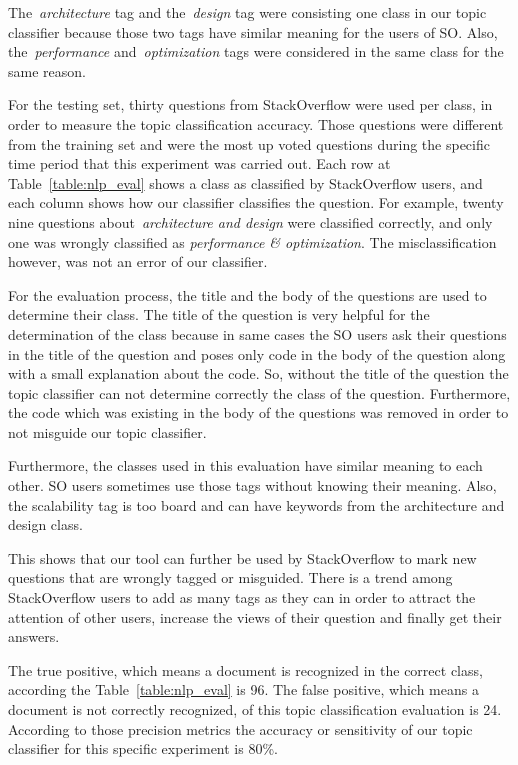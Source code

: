 The~\emph{architecture} tag and the~\emph{design} tag were consisting one class in our topic classifier because those two tags have similar meaning for the users of SO. Also, the~\emph{performance} and~\emph{optimization} tags were considered in the same class for the same reason.

For the testing set, thirty questions from StackOverflow were used per class, in order to measure the topic classification accuracy. Those questions were different from the training set and were the most up voted questions during the specific time period that this experiment was carried out. Each row at Table~\ref{table:nlp_eval} shows a class as classified by StackOverflow users, and each column shows how our classifier classifies the question. For example, twenty nine questions about~\emph{architecture and design} were classified correctly, and only one was wrongly classified as \emph{performance \& optimization}. The misclassification however, was not an error of our classifier. 

For the evaluation process, the title and the body of the questions are used to determine their class. The title of the question is very helpful for the determination of the class because in same cases the SO users ask their questions in the title of the question and poses only code in the body of the question along with a small explanation about the code. So, without the title of the question the topic classifier can not determine correctly the class of the question. Furthermore, the code which was existing in the body of the questions was removed in order to not misguide our topic classifier.

Furthermore, the classes used in this evaluation have similar meaning to each other. SO users sometimes use those tags without knowing their meaning. Also, the scalability tag is too board and can have keywords from the architecture and design class.

This shows that our tool can further be used by StackOverflow to mark new questions that are wrongly tagged or misguided. There is a trend among StackOverflow users to add as many tags as they can in order to attract the attention of other users, increase the views of their question and finally get their answers.  

The true positive, which means a document is recognized in the correct class, according the Table~\ref{table:nlp_eval} is 96. The false positive, which means a document is not correctly recognized, of this topic classification evaluation is 24. According to those precision metrics the accuracy or sensitivity of our topic classifier for this specific experiment is 80\%.

